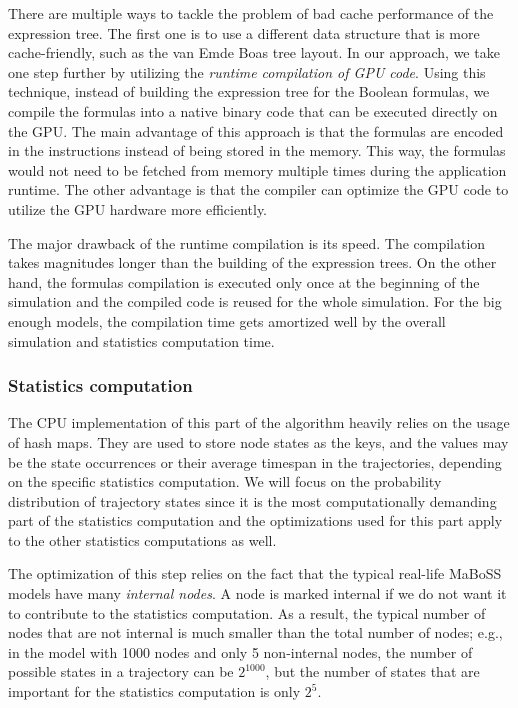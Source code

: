 \documentclass[times, twoside]{zHenriquesLab-StyleBioRxiv}
\begin{document}
There are multiple ways to tackle the problem of bad cache performance of the expression tree. The first one is to use a different data structure that is more cache-friendly, such as the van Emde Boas tree layout. In our approach, we take one step further by utilizing the \emph{runtime compilation of GPU code}. Using this technique, instead of building the expression tree for the Boolean formulas, we compile the formulas into a native binary code that can be executed directly on the GPU. The main advantage of this approach is that the formulas are encoded in the instructions instead of being stored in the memory. This way, the formulas would not need to be fetched from memory multiple times during the application runtime. The other advantage is that the compiler can optimize the GPU code to utilize the GPU hardware more efficiently. 

The major drawback of the runtime compilation is its speed. The compilation takes magnitudes longer than the building of the expression trees. On the other hand, the formulas compilation is executed only once at the beginning of the simulation and the compiled code is reused for the whole simulation. For the big enough models, the compilation time gets amortized well by the overall simulation and statistics computation time.

\subsubsection*{Statistics computation}

The CPU implementation of this part of the algorithm heavily relies on the usage of hash maps. They are used to store node states as the keys, and the values may be the state occurrences or their average timespan in the trajectories, depending on the specific statistics computation. We will focus on the probability distribution of trajectory states since it is the most computationally demanding part of the statistics computation and the optimizations used for this part apply to the other statistics computations as well.

The optimization of this step relies on the fact that the typical real-life MaBoSS models have many \emph{internal nodes}. A node is marked internal if we do not want it to contribute to the statistics computation. As a result, the typical number of nodes that are not internal is much smaller than the total number of nodes; e.g., in the model with 1000 nodes and only 5 non-internal nodes, the number of possible states in a trajectory can be $2^{1000}$, but the number of states that are important for the statistics computation is only $2^5$. 
\end{document}
